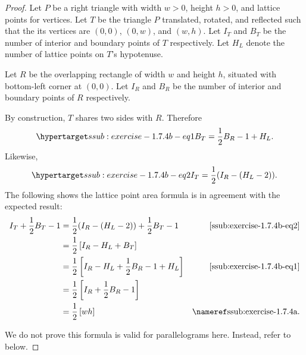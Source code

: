 \documentclass{report}
\begin{document}
  \begin{proof}
    Let $P$ be a right triangle with width $w > 0$, height $h > 0$, and lattice
      points for vertices.
    Let $T$ be the triangle $P$ translated, rotated, and reflected such that the
      its vertices are $(0, 0)$, $(0, w)$, and $(w, h)$.
    Let $I_T$ and $B_T$ be the number of interior and boundary points of $T$
      respectively.
    Let $H_L$ denote the number of lattice points on $T$'s hypotenuse.

    Let $R$ be the overlapping rectangle of width $w$ and height $h$, situated
      with bottom-left corner at $(0, 0)$.
    Let $I_R$ and $B_R$ be the number of interior and boundary points
      of $R$ respectively.

    By construction, $T$ shares two sides with $R$.
    Therefore
      \begin{equation}
        \hyperlabel{ssub:exercise-1.7.4b-eq1}
        B_T = \frac{1}{2}B_R - 1 + H_L.
      \end{equation}
    Likewise,
      \begin{equation}
        \hyperlabel{ssub:exercise-1.7.4b-eq2}
        I_T = \frac{1}{2}(I_R - (H_L - 2)).
      \end{equation}
    The following shows the lattice point area formula is in agreement with
      the expected result:
      \begin{align*}
        I_T + \frac{1}{2}B_T - 1
          & = \frac{1}{2}(I_R - (H_L - 2)) + \frac{1}{2}B_T - 1
            & \eqref{ssub:exercise-1.7.4b-eq2} \\
          & = \frac{1}{2}\left[ I_R - H_L + B_T \right] \\
          & = \frac{1}{2}\left[ I_R - H_L + \frac{1}{2}B_R - 1 + H_L \right]
            & \eqref{ssub:exercise-1.7.4b-eq1} \\
          & = \frac{1}{2}\left[ I_R + \frac{1}{2}B_R - 1 \right] \\
          & = \frac{1}{2}\left[ wh \right] & \textref{ssub:exercise-1.7.4a}.
      \end{align*}

    We do not prove this formula is valid for parallelograms here.
    Instead, refer to  below.
  \end{proof}

\subsubsection{}%
\end{document}
